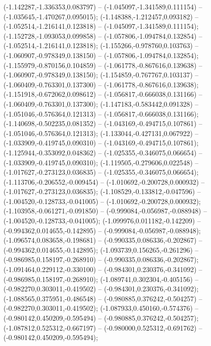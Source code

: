  (-1.142287,-1.336353,0.083797) -- (-1.045097,-1.341589,0.111154) -- (-1.035645,-1.470267,0.095015);
 (-1.148388,-1.212457,0.093182) -- (-1.052514,-1.216141,0.123818) -- (-1.045097,-1.341589,0.111154);
 (-1.152728,-1.093053,0.099858) -- (-1.057806,-1.094784,0.132854) -- (-1.052514,-1.216141,0.123818);
 (-1.155266,-0.978760,0.103763) -- (-1.060907,-0.978349,0.138150) -- (-1.057806,-1.094784,0.132854);
 (-1.155979,-0.870156,0.104859) -- (-1.061778,-0.867616,0.139638) -- (-1.060907,-0.978349,0.138150);
 (-1.154859,-0.767767,0.103137) -- (-1.060409,-0.763301,0.137300) -- (-1.061778,-0.867616,0.139638);
 (-1.151918,-0.672062,0.098612) -- (-1.056817,-0.666038,0.131166) -- (-1.060409,-0.763301,0.137300);
 (-1.147183,-0.583442,0.091328) -- (-1.051046,-0.576364,0.121313) -- (-1.056817,-0.666038,0.131166);
 (-1.140698,-0.502235,0.081352) -- (-1.043169,-0.494715,0.107861) -- (-1.051046,-0.576364,0.121313);
 (-1.133044,-0.427131,0.067922) -- (-1.033909,-0.419745,0.090310) -- (-1.043169,-0.494715,0.107861);
 (-1.125944,-0.353092,0.048362) -- (-1.025355,-0.346075,0.066654) -- (-1.033909,-0.419745,0.090310);
 (-1.119505,-0.279606,0.022548) -- (-1.017627,-0.273123,0.036835) -- (-1.025355,-0.346075,0.066654);
 (-1.113706,-0.206552,-0.009454) -- (-1.010692,-0.200728,0.000932) -- (-1.017627,-0.273123,0.036835);
 (-1.108529,-0.133812,-0.047596) -- (-1.004520,-0.128733,-0.041005) -- (-1.010692,-0.200728,0.000932);
 (-1.103958,-0.061271,-0.091850) -- (-0.999084,-0.056987,-0.088948) -- (-1.004520,-0.128733,-0.041005);
 (-1.099976,0.011182,-0.142209) -- (-0.994362,0.014655,-0.142895) -- (-0.999084,-0.056987,-0.088948);
 (-1.096574,0.083658,-0.198681) -- (-0.990335,0.086336,-0.202867) -- (-0.994362,0.014655,-0.142895);
 (-1.093739,0.156265,-0.261296) -- (-0.986985,0.158197,-0.268910) -- (-0.990335,0.086336,-0.202867);
 (-1.091464,0.229112,-0.330100) -- (-0.984301,0.230376,-0.341092) -- (-0.986985,0.158197,-0.268910);
 (-1.089741,0.302304,-0.405156) -- (-0.982270,0.303011,-0.419502) -- (-0.984301,0.230376,-0.341092);
 (-1.088565,0.375951,-0.486548) -- (-0.980885,0.376242,-0.504257) -- (-0.982270,0.303011,-0.419502);
 (-1.087933,0.450160,-0.574376) -- (-0.980142,0.450209,-0.595494) -- (-0.980885,0.376242,-0.504257);
 (-1.087812,0.525312,-0.667197) -- (-0.980000,0.525312,-0.691762) -- (-0.980142,0.450209,-0.595494);
